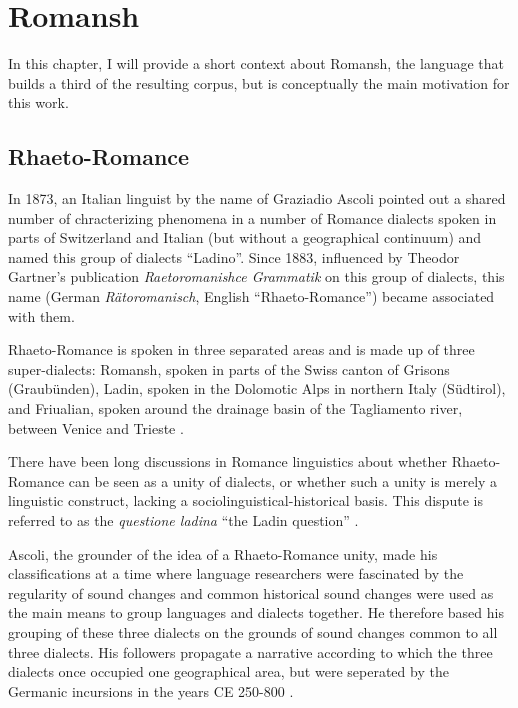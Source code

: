 \chapter{Romansh}\label{chap:romansh}

In this chapter, I will provide a short context about Romansh, the language that builds a third of the resulting corpus, but is conceptually the main motivation for this work.

\section{Rhaeto-Romance}
In 1873, an Italian linguist by the name of Graziadio Ascoli pointed out a shared number of chracterizing phenomena in a number of Romance dialects spoken in parts of Switzerland and Italian (but without a geographical continuum) and named this group of dialects \enquote{Ladino}. Since 1883, influenced by Theodor Gartner's publication \emph{Raetoromanishce Grammatik} on this group of dialects, this name (German \emph{Rätoromanisch}, English \enquote{Rhaeto-Romance}) became associated with them. 

Rhaeto-Romance is spoken in three separated areas and is made up of three super-dialects: Romansh, spoken in parts of the Swiss canton of Grisons (Graubünden), Ladin, spoken in the Dolomotic Alps in northern Italy (Südtirol), and Friualian, spoken around the drainage basin of the Tagliamento river, between Venice and Trieste \autocite[1]{haiman1992}.

There have been long discussions in Romance linguistics about whether Rhaeto-Romance can be seen as a unity of dialects, or whether such a unity is merely a linguistic construct, lacking a sociolinguistical-historical basis. 
This dispute is referred to as the \emph{questione ladina} \enquote{the Ladin question} \autocite{liver1999}. 

Ascoli, the grounder of the idea of a Rhaeto-Romance unity, made his classifications at a time where language researchers were fascinated by the regularity of sound changes and common historical sound changes were used as the main means to group languages and dialects together. He therefore based his grouping of these three dialects on the grounds of sound changes common to all three dialects. 
His followers propagate a narrative according to which the three dialects once occupied one geographical area, but were seperated by the Germanic incursions in the years CE 250-800 \autocites[174]{bossong2008}[11]{haiman1992}.

